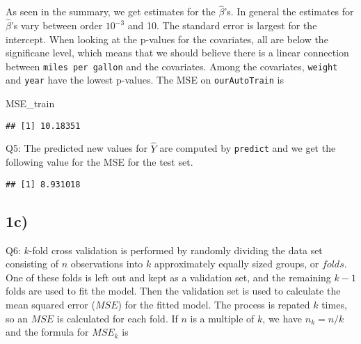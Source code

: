 \documentclass[]{article}
\newenvironment{Shaded}{\begin{snugshade}}{\end{snugshade}}
\newcommand{\KeywordTok}[1]{\textcolor[rgb]{0.13,0.29,0.53}{\textbf{#1}}}
\newcommand{\DecValTok}[1]{\textcolor[rgb]{0.00,0.00,0.81}{#1}}
\newcommand{\OperatorTok}[1]{\textcolor[rgb]{0.81,0.36,0.00}{\textbf{#1}}}
\newcommand{\NormalTok}[1]{#1}
\begin{document}
As seen in the summary, we get estimates for the \(\hat\beta\)'s. In
general the estimates for \(\hat\beta\)'s vary between order \(10^{-3}\)
and 10. The standard error is largest for the intercept. When looking at
the p-values for the covariates, all are below the significane level,
which means that we should believe there is a linear connection between
\texttt{miles\ per\ gallon} and the covariates. Among the covariates,
\texttt{weight} and \texttt{year} have the lowest p-values. The MSE on
\texttt{ourAutoTrain} is

\begin{Shaded}
\begin{Highlighting}[]
\NormalTok{MSE_train}
\end{Highlighting}
\end{Shaded}

\begin{verbatim}
## [1] 10.18351
\end{verbatim}

Q5: The predicted new values for \(\hat Y\) are computed by
\texttt{predict} and we get the following value for the MSE for the test
set.

\begin{Shaded}
\end{Shaded}

\begin{verbatim}
## [1] 8.931018
\end{verbatim}

\subsection{1c)}\label{c}

Q6: \(k\)-fold cross validation is performed by randomly dividing the
data set consisting of \(n\) observations into \(k\) approximately
equally sized groups, or \(folds\). One of these folds is left out and
kept as a validation set, and the remaining \(k-1\) folds are used to
fit the model. Then the validation set is used to calculate the mean
squared error (\(MSE\)) for the fitted model. The process is repated
\(k\) times, so an \(MSE\) is calculated for each fold. If \(n\) is a
multiple of \(k\), we have \(n_k=n/k\) and the formula for \(MSE_k\) is
\end{document}
